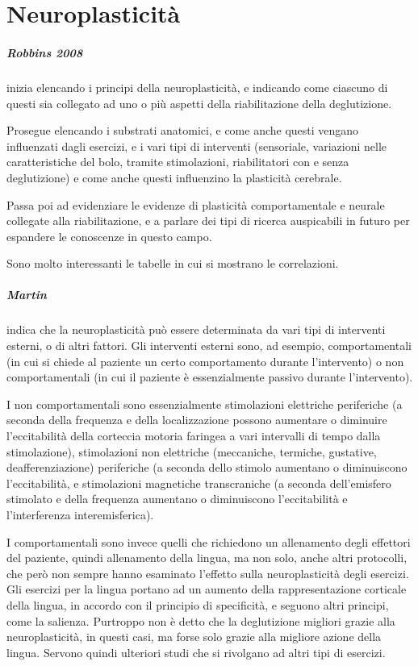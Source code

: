 \chapter{Neuroplasticità}
\paragraph{Robbins 2008} \label{par:rob2008} \cite{Robbins2008} inizia 
elencando i principi della neuroplasticità, e indicando come ciascuno di questi 
sia collegato ad uno o più aspetti della riabilitazione della deglutizione.

Prosegue elencando i substrati anatomici, e come anche questi vengano 
influenzati dagli esercizi, e i vari tipi di interventi (sensoriale, variazioni 
nelle caratteristiche del bolo, tramite stimolazioni, riabilitatori con e senza 
deglutizione) e come anche questi influenzino la plasticità cerebrale.

Passa poi ad evidenziare le evidenze di plasticità comportamentale e neurale 
collegate alla riabilitazione, e a parlare dei tipi di ricerca auspicabili in 
futuro per espandere le conoscenze in questo campo.

Sono molto interessanti le tabelle in cui si mostrano le correlazioni.

\paragraph{Martin} \label{par:mar} \cite{Martin2009} indica che la 
neuroplasticità può essere determinata da vari tipi di interventi esterni, o di 
altri fattori.
Gli interventi esterni sono, ad esempio, comportamentali (in cui si chiede al 
paziente un certo comportamento durante l'intervento) o non comportamentali (in 
cui il paziente è essenzialmente passivo durante l'intervento).

I non comportamentali sono essenzialmente stimolazioni elettriche periferiche 
(a seconda della frequenza e della localizzazione possono aumentare o diminuire 
l'eccitabilità della corteccia motoria faringea a vari intervalli di tempo 
dalla stimolazione), stimolazioni non elettriche (meccaniche, termiche, 
gustative, deafferenziazione) periferiche (a seconda dello stimolo aumentano o 
diminuiscono l'eccitabilità, e stimolazioni magnetiche transcraniche (a seconda 
dell'emisfero stimolato e della frequenza aumentano o diminuiscono 
l'eccitabilità e l'interferenza interemisferica).

I comportamentali sono invece quelli che richiedono un allenamento degli 
effettori del paziente, quindi allenamento della lingua, ma non solo, anche 
altri protocolli, che però non sempre hanno esaminato l'effetto sulla 
neuroplasticità degli esercizi.
Gli esercizi per la lingua portano ad un aumento della rappresentazione 
corticale della lingua, in accordo con il principio di specificità, e seguono 
altri principi, come la salienza.
Purtroppo non è detto che la deglutizione migliori grazie alla neuroplasticità, 
in questi casi, ma forse solo grazie alla migliore azione della lingua.
Servono quindi ulteriori studi che si rivolgano ad altri tipi di esercizi.

